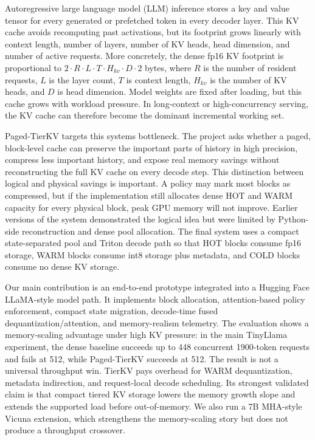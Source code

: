 \documentclass{article}
\begin{document}
Autoregressive large language model (LLM) inference stores a key and value tensor for every generated or prefetched token in every decoder layer. This KV cache avoids recomputing past activations, but its footprint grows linearly with context length, number of layers, number of KV heads, head dimension, and number of active requests. More concretely, the dense fp16 KV footprint is proportional to
$
2 \cdot R \cdot L \cdot T \cdot H_{kv} \cdot D \cdot 2
$
bytes, where $R$ is the number of resident requests, $L$ is the layer count, $T$ is context length, $H_{kv}$ is the number of KV heads, and $D$ is head dimension. Model weights are fixed after loading, but this cache grows with workload pressure. In long-context or high-concurrency serving, the KV cache can therefore become the dominant incremental working set.

Paged-TierKV targets this systems bottleneck. The project asks whether a paged, block-level cache can preserve the important parts of history in high precision, compress less important history, and expose real memory savings without reconstructing the full KV cache on every decode step. This distinction between logical and physical savings is important. A policy may mark most blocks as compressed, but if the implementation still allocates dense HOT and WARM capacity for every physical block, peak GPU memory will not improve. Earlier versions of the system demonstrated the logical idea but were limited by Python-side reconstruction and dense pool allocation. The final system uses a compact state-separated pool and Triton decode path so that HOT blocks consume fp16 storage, WARM blocks consume int8 storage plus metadata, and COLD blocks consume no dense KV storage.

Our main contribution is an end-to-end prototype integrated into a Hugging Face LLaMA-style model path. It implements block allocation, attention-based policy enforcement, compact state migration, decode-time fused dequantization/attention, and memory-realism telemetry. The evaluation shows a memory-scaling advantage under high KV pressure: in the main TinyLlama experiment, the dense baseline succeeds up to 448 concurrent 1900-token requests and fails at 512, while Paged-TierKV succeeds at 512. The result is not a universal throughput win. TierKV pays overhead for WARM dequantization, metadata indirection, and request-local decode scheduling. Its strongest validated claim is that compact tiered KV storage lowers the memory growth slope and extends the supported load before out-of-memory. We also run a 7B MHA-style Vicuna extension, which strengthens the memory-scaling story but does not produce a throughput crossover.
\end{document}
